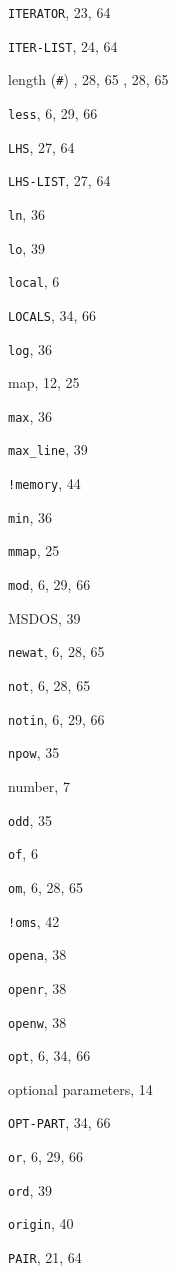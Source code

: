 \begin{theindex}
\item {{\tt ITERATOR}}, 23, 64
\item {{\tt ITER-LIST}}, 24, 64
\indexspace
\indexspace
\indexspace
\item {length ({\tt \#})}
	, 28, 65
	, 28, 65
\item {{\tt less}}, 6, 29, 66
\item {{\tt LHS}}, 27, 64
\item {{\tt LHS-LIST}}, 27, 64
\item {{\tt ln}}, 36
\item {{\tt lo}}, 39
\item {{\tt local}}, 6
\item {{\tt LOCALS}}, 34, 66
\item {{\tt log}}, 36
\indexspace
\item {map}, 12, 25
\item {{\tt max}}, 36
\item {{\tt max\_line}}, 39
\item {{\tt !memory}}, 44
\item {{\tt min}}, 36
\item {{\tt mmap}}, 25
\item {{\tt mod}}, 6, 29, 66
\item {MSDOS}, 39
\indexspace
\item {{\tt newat}}, 6, 28, 65
\item {{\tt not}}, 6, 28, 65
\item {{\tt notin}}, 6, 29, 66
\item {{\tt npow}}, 35
\item {number}, 7
\indexspace
\item {{\tt odd}}, 35
\item {{\tt of}}, 6
\item {{\tt om}}, 6, 28, 65
\item {{\tt !oms}}, 42
\item {{\tt opena}}, 38
\item {{\tt openr}}, 38
\item {{\tt openw}}, 38
\item {{\tt opt}}, 6, 34, 66
\item {optional parameters}, 14
\item {{\tt OPT-PART}}, 34, 66
\item {{\tt or}}, 6, 29, 66
\item {{\tt ord}}, 39
\item {{\tt origin}}, 40
\indexspace
\item {{\tt PAIR}}, 21, 64

\end{theindex}
